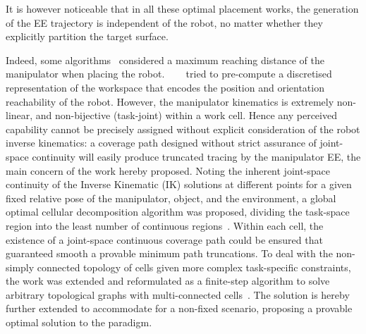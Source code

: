\documentclass[letterpaper, 10pt, conference]{ieeeconf}
\begin{document}
It is however noticeable that in all these optimal placement works, the generation of the EE trajectory is independent of the robot, no matter whether they explicitly partition the target surface. 

Indeed, some algorithms~\cite{Vahrenkamp2013Robot} considered a maximum reaching distance of the manipulator when placing the robot.
~\cite{Zacharias2007Capturing}~\cite{Zacharias2009Using}~\cite{Malhan2019Identifying} tried to pre-compute a discretised representation of the workspace that encodes the position and orientation reachability of the robot. 
However, the manipulator kinematics is extremely non-linear, and non-bijective (task-joint) within a work cell. Hence any perceived capability cannot be precisely assigned without explicit consideration of the robot inverse kinematics: a coverage path designed without strict assurance of joint-space continuity will easily produce truncated tracing by the manipulator EE, the main concern of the work hereby proposed. 
Noting the inherent joint-space continuity of the Inverse Kinematic (IK) solutions at different points for a given fixed relative pose of the manipulator, object, and the environment, a global optimal cellular decomposition algorithm was proposed, dividing the task-space region into the least number of continuous regions~\cite{Yang2020Cellular}. Within each cell, the existence of a joint-space continuous coverage path could be ensured that guaranteed smooth a provable minimum path truncations. To deal with the non-simply connected topology of cells given more complex task-specific constraints, the work was extended and reformulated as a finite-step algorithm to solve arbitrary topological graphs with multi-connected cells~\cite{Yang2020Nonrevisiting}. 
The solution is hereby further extended to accommodate for a non-fixed scenario, proposing a provable optimal solution to the paradigm.
\end{document}
